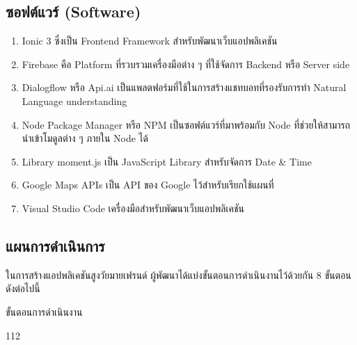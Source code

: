\subsection{ซอฟต์แวร์ (Software)}
\begin{enumerate}
	\item Ionic 3 ซึ่งเป็น Frontend Framework สำหรับพัฒนาเว็บแอปพลิเคชัน
	\item Firebase คือ Platform ที่รวบรวมเครื่องมือต่าง ๆ ที่ใช้จัดการ Backend หรือ Server side
	\item Dialogflow หรือ Api.ai เป็นแพลตฟอร์มที่ใช้ในการสร้างแชทบอทที่รองรับการทำ Natural Language understanding
	\item Node Package Manager หรือ NPM เป็นซอฟต์แวร์ที่มาพร้อมกับ Node ที่ช่วยให้สามารถนำเข้าโมดูลต่าง ๆ ภายใน Node ได้
	\item Library moment.js เป็น JavaScript Library สำหรับจัดการ Date & Time
	\item Google Maps APIs เป็น API ของ Google ไว้สำหรับเรียกใช้แผนที่
	\item Visual Studio Code เครื่องมือสำหรับพัฒนาเว็บแอปพลิเคชัน
\end{enumerate}

\newpage
\subsection{แผนการดำเนินการ}
	ในการสร้างแอปพลิเคชันสูงวัยมายเฟรนด์ ผู้พัฒนาได้แบ่งขั้นตอนการดำเนินงานไว้ด้วยกัน 8 ขั้นตอน ดังต่อไปนี้

\begin{table}[H]
	\noindent
	\caption{ขั้นตอนการดำเนินงาน}
	\begin{ganttchart}[
		canvas/.append style={fill=none, draw=black!5, line width=.75pt},
		vgrid={*2{draw=black!7, line width=.75pt}},
		title label font=\bfseries\footnotesize,
		bar label node/.append style={
			align=left,
			text width=width("10. Functional Testing On")},
		bar/.append style={draw=none, fill=black!63}
		]{1}{12}
		\\
		 \\
		 \\
		 \\
		 \\
		 \\
		 \\
		 \\
		 \\
		 \\
	\end{ganttchart}
	\label{tab:ganttchart}
\end{table}
